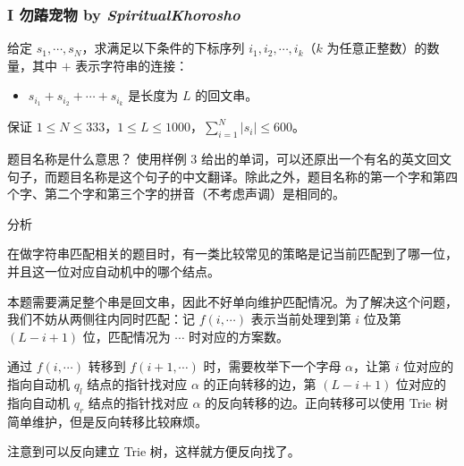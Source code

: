 \frame
{
	\frametitle{I 勿蹖宠物 {by \itshape SpiritualKhorosho}}

	给定 $s_1, \cdots, s_N$，求满足以下条件的下标序列 $i_1, i_2, \cdots, i_k$（$k$ 为任意正整数）的数量，其中 $+$ 表示字符串的连接：
	\begin{itemize}
		\item $s_{i_1} + s_{i_2} + \cdots + s_{i_k}$ 是长度为 $L$ 的回文串。
	\end{itemize}

	保证 $1\le N\le 333$，$1\le L\le 1000$，$\sum_{i=1}^N \left|s_i\right| \le 600$。

	\begin{block}{题目名称是什么意思？}
		使用样例 3 给出的单词，可以还原出一个有名的英文回文句子，而题目名称是这个句子的中文翻译。除此之外，题目名称的第一个字和第四个字、第二个字和第三个字的拼音（不考虑声调）是相同的。
	\end{block}

}

\begin{frame}{分析}
	
	在做字符串匹配相关的题目时，有一类比较常见的策略是记当前匹配到了哪一位，并且这一位对应自动机中的哪个结点。

	本题需要满足整个串是回文串，因此不好单向维护匹配情况。为了解决这个问题，我们不妨从两侧往内同时匹配：记 $f(i,\cdots)$ 表示当前处理到第 $i$ 位及第 $(L-i+1)$ 位，匹配情况为 $\cdots$ 时对应的方案数。\pause

	通过 $f(i,\cdots)$ 转移到 $f(i+1,\cdots)$ 时，需要枚举下一个字母 $\alpha$，让第 $i$ 位对应的指向自动机 $q_l$ 结点的指针找对应 $\alpha$ 的正向转移的边，第 $(L-i+1)$ 位对应的指向自动机 $q_r$ 结点的指针找对应 $\alpha$ 的反向转移的边。正向转移可以使用 Trie 树简单维护，但是反向转移比较麻烦。\pause

	注意到可以反向建立 Trie 树，这样就方便反向找了。

\end{frame}

